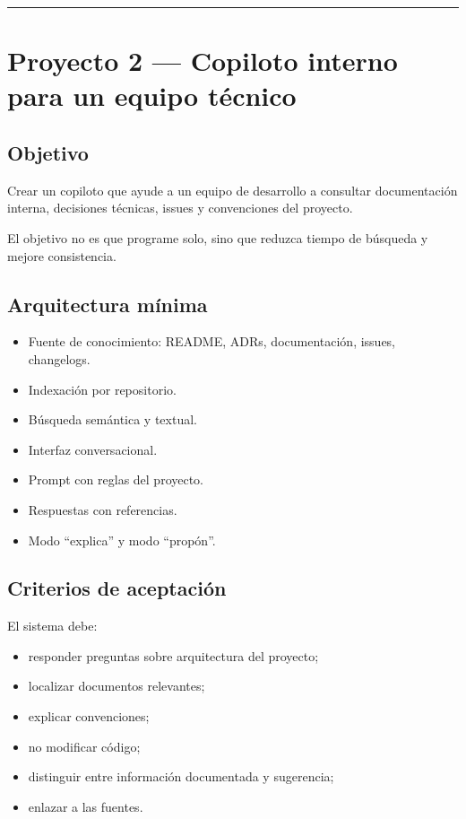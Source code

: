 \begin{center}\rule{0.5\linewidth}{0.5pt}\end{center}

\section{Proyecto 2 --- Copiloto interno para un equipo
técnico}\label{proyecto-2-copiloto-interno-para-un-equipo-tuxe9cnico}

\subsection{Objetivo}\label{objetivo-4}

Crear un copiloto que ayude a un equipo de desarrollo a consultar
documentación interna, decisiones técnicas, issues y convenciones del
proyecto.

El objetivo no es que programe solo, sino que reduzca tiempo de búsqueda
y mejore consistencia.

\subsection{Arquitectura mínima}\label{arquitectura-muxednima-2}

\begin{itemize}
\tightlist
\item
  Fuente de conocimiento: README, ADRs, documentación, issues,
  changelogs.
\item
  Indexación por repositorio.
\item
  Búsqueda semántica y textual.
\item
  Interfaz conversacional.
\item
  Prompt con reglas del proyecto.
\item
  Respuestas con referencias.
\item
  Modo ``explica'' y modo ``propón''.
\end{itemize}

\subsection{Criterios de aceptación}\label{criterios-de-aceptaciuxf3n-1}

El sistema debe:

\begin{itemize}
\tightlist
\item
  responder preguntas sobre arquitectura del proyecto;
\item
  localizar documentos relevantes;
\item
  explicar convenciones;
\item
  no modificar código;
\item
  distinguir entre información documentada y sugerencia;
\item
  enlazar a las fuentes.
\end{itemize}

